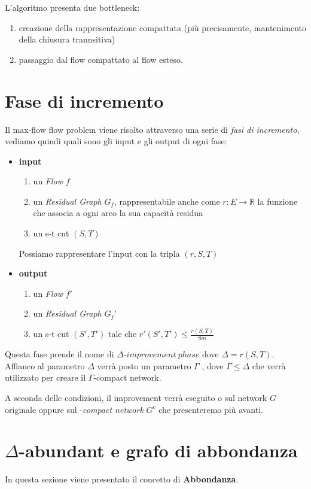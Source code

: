 L'algoritmo presenta due bottleneck: 
\begin{enumerate}
    \item creazione della rappresentazione compattata (più precisamente, mantenimento della chiusura trannsitiva)
    \item passaggio dal flow compattato al flow esteso.
\end{enumerate}

\section{Fase di incremento}
Il max-flow flow problem viene risolto attraverso una serie di \textit{fasi di incremento}, vediamo quindi quali sono gli input e gli output di ogni fase:
\begin{itemize}[itemsep=0.5ex]
    \item \textbf{input}
    \begin{enumerate}
        \item un \textit{Flow} $f$
        \item un \textit{Residual Graph} $G_f$, rappresentabile anche come $r: E \rightarrow \mathbb{R}$ la funzione che associa a ogni arco la sua capacità residua
        \item un s-t cut $(S,T)$
    \end{enumerate}
    Possiamo rappresentare l'input con la tripla $(r,S,T)$
    \item \textbf{output}
    \begin{enumerate}
        \item un \textit{Flow} $f'$
        \item un \textit{Residual Graph} $G_f'$
        \item un s-t cut $(S',T')$ tale che $r'(S',T') \le \frac{r(S,T)}{8m}$
    \end{enumerate}
\end{itemize}
Questa fase prende il nome di $\Delta\text{-}improvement\ phase$ dove $\Delta = r(S,T)$.
Affianco al parametro $\Delta$ verrà posto un parametro $\Gamma$ , dove $\Gamma \le \Delta$ che verrà utilizzato per creare il $\Gamma$-compact network. 

A seconda delle condizioni, il \dlt improvement verrà eseguito o sul network $G$ originale oppure sul \gmm-\textit{compact network} $G^c$ che presenteremo più avanti.

\section{$\Delta$-abundant e grafo di abbondanza}
In questa sezione viene presentato il concetto di \textbf{Abbondanza}.

